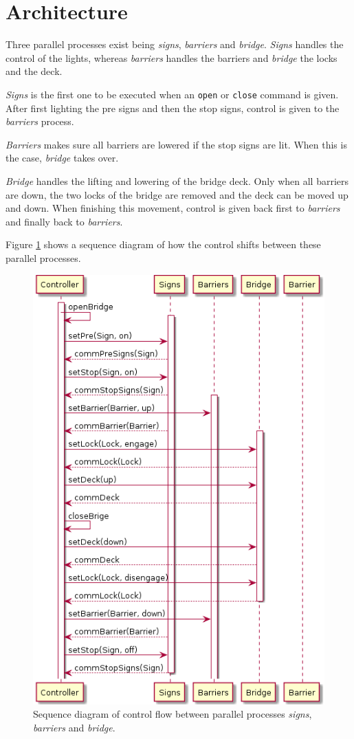 \section{Architecture}
\label{sec:trans}


Three parallel processes exist being \emph{signs}, \emph{barriers} and \emph{bridge}. \emph{Signs} handles the control of the lights, whereas \emph{barriers} handles the barriers and \emph{bridge} the locks and the deck.

\emph{Signs} is the first one to be executed when an \texttt{open} or \texttt{close} command is given. After first lighting the pre signs and then the stop signs, control is given to the \emph{barriers} process.

\emph{Barriers} makes sure all barriers are lowered if the stop signs are lit. When this is the case, \emph{bridge} takes over.

\emph{Bridge} handles the lifting and lowering of the bridge deck. Only when all barriers are down, the two locks of the bridge are removed and the deck can be moved up and down. When finishing this movement, control is given back first to \emph{barriers} and finally back to \emph{barriers}.

Figure \ref{fig:arch} shows a sequence diagram of how the control shifts between these parallel processes.
%
\begin{figure}%
\centering
\includegraphics[width=0.5\columnwidth]{Architecture}%
\caption{Sequence diagram of control flow between parallel processes \emph{signs}, \emph{barriers} and \emph{bridge}.}%
\label{fig:arch}%
\end{figure}

